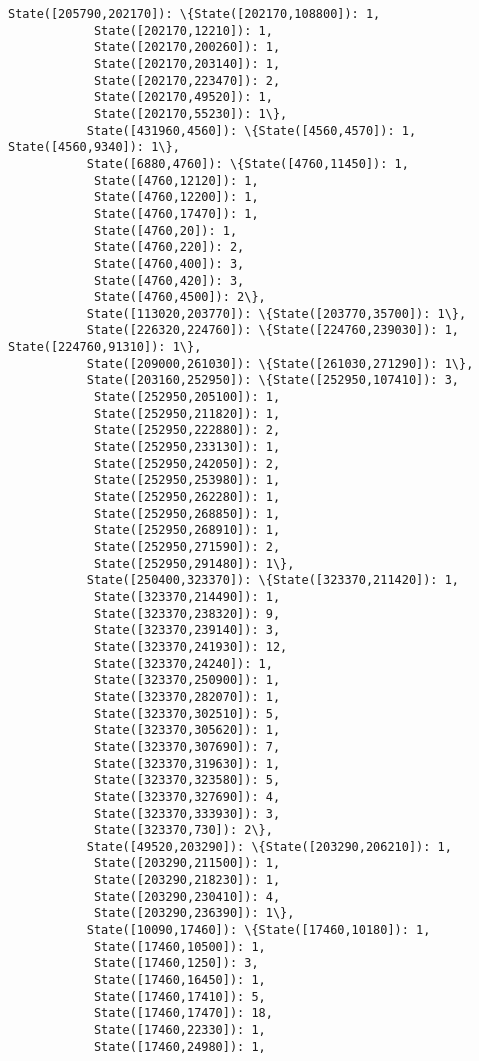 \documentclass[11pt]{article}
\begin{document}
\begin{Verbatim}[commandchars=\\\{\}]
           State([205790,202170]): \{State([202170,108800]): 1,
            State([202170,12210]): 1,
            State([202170,200260]): 1,
            State([202170,203140]): 1,
            State([202170,223470]): 2,
            State([202170,49520]): 1,
            State([202170,55230]): 1\},
           State([431960,4560]): \{State([4560,4570]): 1, State([4560,9340]): 1\},
           State([6880,4760]): \{State([4760,11450]): 1,
            State([4760,12120]): 1,
            State([4760,12200]): 1,
            State([4760,17470]): 1,
            State([4760,20]): 1,
            State([4760,220]): 2,
            State([4760,400]): 3,
            State([4760,420]): 3,
            State([4760,4500]): 2\},
           State([113020,203770]): \{State([203770,35700]): 1\},
           State([226320,224760]): \{State([224760,239030]): 1, State([224760,91310]): 1\},
           State([209000,261030]): \{State([261030,271290]): 1\},
           State([203160,252950]): \{State([252950,107410]): 3,
            State([252950,205100]): 1,
            State([252950,211820]): 1,
            State([252950,222880]): 2,
            State([252950,233130]): 1,
            State([252950,242050]): 2,
            State([252950,253980]): 1,
            State([252950,262280]): 1,
            State([252950,268850]): 1,
            State([252950,268910]): 1,
            State([252950,271590]): 2,
            State([252950,291480]): 1\},
           State([250400,323370]): \{State([323370,211420]): 1,
            State([323370,214490]): 1,
            State([323370,238320]): 9,
            State([323370,239140]): 3,
            State([323370,241930]): 12,
            State([323370,24240]): 1,
            State([323370,250900]): 1,
            State([323370,282070]): 1,
            State([323370,302510]): 5,
            State([323370,305620]): 1,
            State([323370,307690]): 7,
            State([323370,319630]): 1,
            State([323370,323580]): 5,
            State([323370,327690]): 4,
            State([323370,333930]): 3,
            State([323370,730]): 2\},
           State([49520,203290]): \{State([203290,206210]): 1,
            State([203290,211500]): 1,
            State([203290,218230]): 1,
            State([203290,230410]): 4,
            State([203290,236390]): 1\},
           State([10090,17460]): \{State([17460,10180]): 1,
            State([17460,10500]): 1,
            State([17460,1250]): 3,
            State([17460,16450]): 1,
            State([17460,17410]): 5,
            State([17460,17470]): 18,
            State([17460,22330]): 1,
            State([17460,24980]): 1,

\end{Verbatim}
\end{document}
